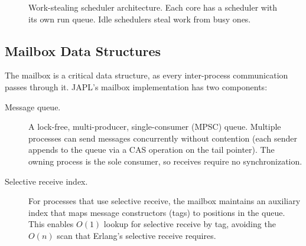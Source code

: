 \documentclass[11pt,a4paper]{article}
\begin{document}
\begin{figure}[H]
\centering
{}
\caption{Work-stealing scheduler architecture. Each core has a scheduler with its own run queue. Idle schedulers steal work from busy ones.}
\label{fig:scheduler}
\end{figure}

\subsection{Mailbox Data Structures}\label{sec:impl-mailbox}

The mailbox is a critical data structure, as every inter-process communication passes through it. JAPL's mailbox implementation has two components:

\begin{description}
\item[Message queue.] A lock-free, multi-producer, single-consumer (MPSC) queue. Multiple processes can send messages concurrently without contention (each sender appends to the queue via a CAS operation on the tail pointer). The owning process is the sole consumer, so receives require no synchronization.

\item[Selective receive index.] For processes that use selective receive, the mailbox maintains an auxiliary index that maps message constructors (tags) to positions in the queue. This enables $O(1)$ lookup for selective receive by tag, avoiding the $O(n)$ scan that Erlang's selective receive requires.
\end{description}
\end{document}
